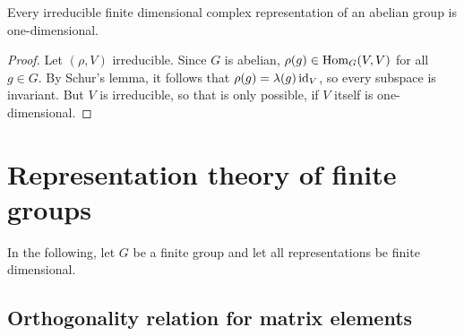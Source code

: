 \begin{cor}[]
  Every irreducible finite dimensional complex representation of an abelian group is one-dimensional.
\end{cor}
\begin{proof}
  Let $(\rho,V)$ irreducible. Since $G$ is abelian, $\rho(g) \in \operatorname{Hom}_G(V,V)$ for all $g \in G$. By Schur's lemma, it follows that $\rho(g) = \lambda(g) \operatorname{id}_V$, so every subspace is invariant. 
  But $V$ is irreducible, so that is only possible, if $V$ itself is one-dimensional.
\end{proof}



\section{Representation theory of finite groups}
In the following, let $G$ be a finite group and let all representations be finite dimensional.

\subsection{Orthogonality relation for matrix elements}

